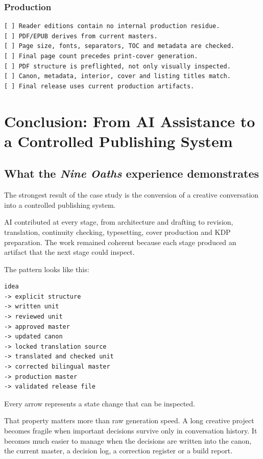 \documentclass[11pt,oneside,openany]{book}
\begin{document}
\section{Production}\label{production}

\begin{lstlisting}
[ ] Reader editions contain no internal production residue.
[ ] PDF/EPUB derives from current masters.
[ ] Page size, fonts, separators, TOC and metadata are checked.
[ ] Final page count precedes print-cover generation.
[ ] PDF structure is preflighted, not only visually inspected.
[ ] Canon, metadata, interior, cover and listing titles match.
[ ] Final release uses current production artifacts.
\end{lstlisting}

\part{Conclusion: From AI Assistance to a Controlled Publishing System}

\chapter{\texorpdfstring{What the \emph{Nine Oaths} experience demonstrates}{What the Nine Oaths experience demonstrates}}\label{what-the-nine-oaths-experience-demonstrates}

The strongest result of the case study is the conversion of a creative conversation into a controlled publishing system.

AI contributed at every stage, from architecture and drafting to revision, translation, continuity checking, typesetting, cover production and KDP preparation. The work remained coherent because each stage produced an artifact that the next stage could inspect.

The pattern looks like this:

\begin{lstlisting}
idea
-> explicit structure
-> written unit
-> reviewed unit
-> approved master
-> updated canon
-> locked translation source
-> translated and checked unit
-> corrected bilingual master
-> production master
-> validated release file
\end{lstlisting}

Every arrow represents a state change that can be inspected.

That property matters more than raw generation speed. A long creative project becomes fragile when important decisions survive only in conversation history. It becomes much easier to manage when the decisions are written into the canon, the current master, a decision log, a correction register or a build report.
\end{document}
